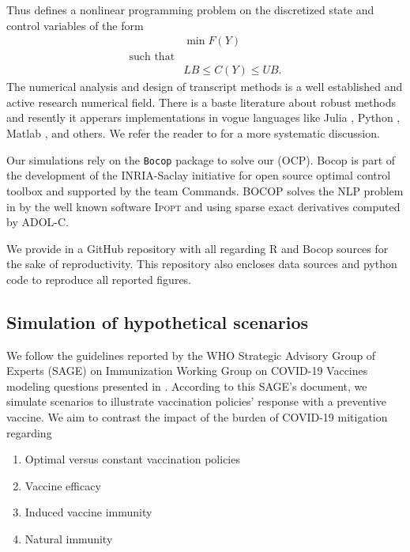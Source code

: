 Thus  defines a nonlinear programming problem on the
discretized state and control variables of the form
\begin{equation}
    \label{eqn:nlp_form}
    \begin{aligned}
        &
        \min F(Y)
        \\
        \text{such that} &
        \\
        &
        LB \leq C(Y) \leq UB .
    \end{aligned}
\end{equation}
%
The numerical analysis and design of transcript methods is a well
established  and active research numerical field. There is a baste
literature about robust methods and resently it apperars implementations in
vogue languages like Julia
\cite{DunningHuchetteLubin2017, LubinDunningIJOC}, Python \cite{libcmaes},
Matlab \cite{matlabOpt}, and others. We refer the reader to
\cite{Betts2001,Seywald1993} for a more systematic discussion.

Our simulations rely on the \verb|Bocop| package
\cite{Bocop,BocopExamples} to solve our (OCP). Bocop is part of the
development of the INRIA-Saclay initiative for open source optimal control
toolbox and supported by the team Commands. BOCOP solves the NLP problem in
 by the well known software \textsc{Ipopt} and using
sparse exact derivatives computed by ADOL-C.

We provide in \cite{gitHub} a GitHub repository with all regarding R
and Bocop sources for the sake of reproductivity. This repository also
encloses data sources and python code to reproduce all reported figures.

\subsection{Simulation of hypothetical scenarios}
We follow the guidelines reported by the WHO Strategic Advisory Group
of Experts (SAGE) on Immunization Working Group on COVID-19 Vaccines
modeling questions presented in \cite{sage2020}. According to this SAGE's
document, we simulate scenarios to illustrate vaccination policies'
response with a preventive vaccine. We aim to contrast the impact of the
burden of COVID-19 mitigation regarding
\begin{enumerate}
    \item Optimal versus constant vaccination policies
    \item Vaccine efficacy
    \item Induced vaccine immunity
    \item Natural immunity
\end{enumerate}

